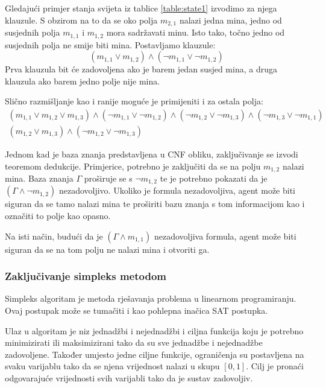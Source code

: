 \documentclass{article}
\numberwithin{figure}{section}
\numberwithin{table}{section}
\begin{document}
Gledajući primjer stanja svijeta iz tablice \ref{table:state1} izvodimo za njega klauzule.
S obzirom na to da se oko polja $m_{2, 1}$ nalazi jedna mina, jedno od susjednih polja $m_{1,1}$ i $m_{1, 2}$ mora sadržavati minu. Isto tako, točno jedno od susjednih polja ne smije biti mina. Postavljamo klauzule:
\begin{equation*}
    (m_{1, 1} \vee m_{1, 2}) \wedge (\neg m_{1, 1} \vee \neg m_{1, 2})
\end{equation*}
Prva klauzula bit će zadovoljena ako
je barem jedan susjed mina, a druga klauzula ako barem jedno polje nije mina.

Slično razmišljanje kao i ranije moguće je primijeniti i za ostala polja:
\begin{gather*}
    (m_{1, 1} \vee m_{1, 2} \vee m_{1, 3}) \wedge
        (\neg m_{1, 1} \vee \neg m_{1, 2}) \wedge
        (\neg m_{1, 2} \vee \neg m_{1, 3}) \wedge
        (\neg m_{1, 3} \vee \neg m_{1, 1}) \\
    (m_{1, 2} \vee m_{1, 3}) \wedge (\neg m_{1, 2} \vee \neg m_{1, 3})
\end{gather*}

Jednom kad je baza znanja predstavljena u CNF obliku, zaključivanje se izvodi teoremom dedukcije.
Primjerice, potrebno je zaključiti da se na polju $m_{1, 2}$ nalazi mina. Baza znanja $\Gamma$
proširuje se s $\neg m_{1, 2}$ te je potrebno pokazati da je $(\Gamma \wedge \neg m_{1, 2})$
nezadovoljivo. Ukoliko je formula nezadovoljiva, agent može biti siguran da se tamo nalazi mina te proširiti
bazu znanja s tom informacijom kao i označiti to polje kao opasno.

Na isti način, budući da je $(\Gamma \wedge m_{1, 1})$ nezadovoljiva formula, agent može biti siguran da se na tom polju ne nalazi mina i otvoriti ga.


\subsubsection{Zaključivanje simpleks metodom} \label{simplex}
Simpleks algoritam je metoda rješavanja problema u linearnom programiranju.
Ovaj postupak može se
tumačiti i kao pohlepna inačica SAT postupka.

Ulaz u algoritam je niz jednadžbi i nejednadžbi i ciljna funkcija koju je potrebno minimizirati ili maksimizirani tako da su sve jednadžbe i nejednadžbe zadovoljene. Također umjesto jedne ciljne funkcije, ograničenja su postavljena na svaku varijablu tako da se njena vrijednost nalazi u skupu $[0, 1]$. Cilj je pronaći odgovarajuće vrijednosti svih varijabli tako da je sustav zadovoljiv.
\end{document}

